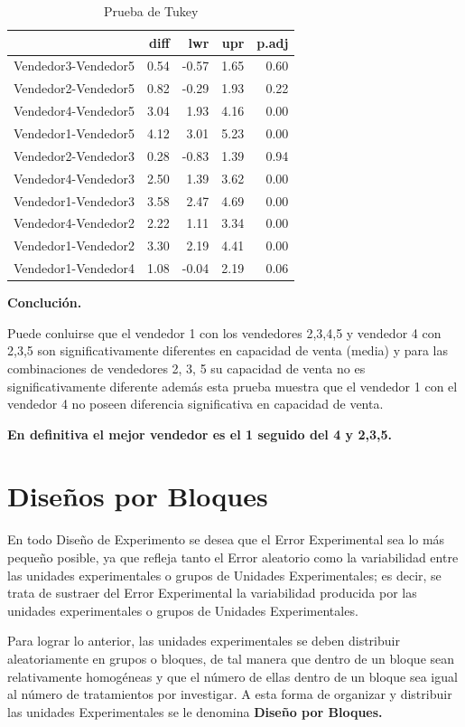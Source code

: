 \documentclass[12pt,letterpaper]{report}
\begin{document}
\begin{table}[ht]
\centering
\begin{tabular}{rrrrr}
  \hline
 & diff & lwr & upr & p.adj \\ 
  \hline
Vendedor3-Vendedor5 & 0.54 & -0.57 & 1.65 & 0.60 \\ 
  Vendedor2-Vendedor5 & 0.82 & -0.29 & 1.93 & 0.22 \\ 
  Vendedor4-Vendedor5 & 3.04 & 1.93 & 4.16 & 0.00 \\ 
  Vendedor1-Vendedor5 & 4.12 & 3.01 & 5.23 & 0.00 \\ 
  Vendedor2-Vendedor3 & 0.28 & -0.83 & 1.39 & 0.94 \\ 
  Vendedor4-Vendedor3 & 2.50 & 1.39 & 3.62 & 0.00 \\ 
  Vendedor1-Vendedor3 & 3.58 & 2.47 & 4.69 & 0.00 \\ 
  Vendedor4-Vendedor2 & 2.22 & 1.11 & 3.34 & 0.00 \\ 
  Vendedor1-Vendedor2 & 3.30 & 2.19 & 4.41 & 0.00 \\ 
  Vendedor1-Vendedor4 & 1.08 & -0.04 & 2.19 & 0.06 \\ 
   \hline
\end{tabular}
\caption{Prueba de Tukey}
\end{table}

\textbf{Conclución.}

Puede conluirse que el vendedor 1 con los vendedores 2,3,4,5 y vendedor 4 con 2,3,5 son significativamente diferentes en capacidad de venta (media) y para las combinaciones de vendedores 2, 3, 5 su capacidad de venta no es significativamente diferente además esta prueba muestra que el vendedor 1 con el vendedor 4 no poseen diferencia significativa en capacidad de venta.

\textbf{En definitiva el mejor vendedor es el 1 seguido del 4 y 2,3,5.}
\newpage
\chapter*{Diseños por Bloques}
En todo Diseño de Experimento se desea que el Error Experimental sea lo más pequeño
posible, ya que refleja tanto el Error aleatorio como la variabilidad entre las unidades
experimentales o grupos de Unidades Experimentales; es decir, se trata de sustraer del Error
Experimental la variabilidad producida por las unidades experimentales o grupos de Unidades
Experimentales.

Para lograr lo anterior, las unidades experimentales se deben distribuir aleatoriamente
en grupos o bloques, de tal manera que dentro de un bloque sean relativamente homogéneas y
que el número de ellas dentro de un bloque sea igual al número de tratamientos por investigar.
A esta forma de organizar y distribuir las unidades Experimentales se le denomina \textbf{Diseño por Bloques.}
\end{document}
